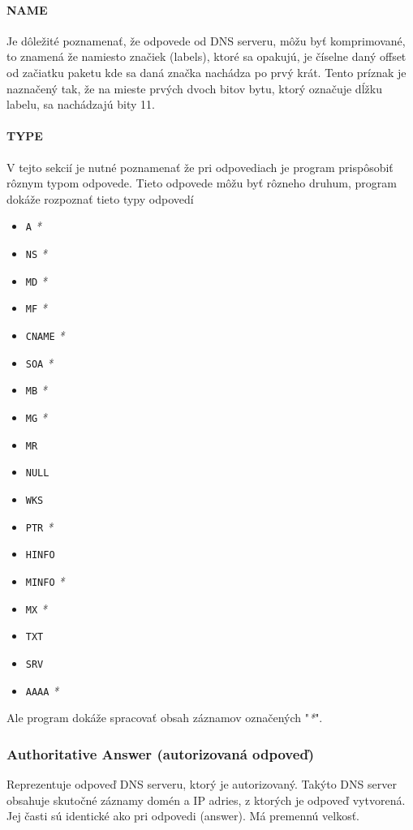 \documentclass[titlepage]{article}
\begin{document}
\paragraph{NAME}
Je dôležité poznamenať, že odpovede od DNS serveru, môžu byť komprimované,
to znamená že namiesto značiek (labels), ktoré sa opakujú, je číselne daný offset
od začiatku paketu kde sa daná značka nachádza po prvý krát. Tento príznak je naznačený tak,
že na mieste prvých dvoch bitov bytu, ktorý označuje dĺžku labelu, sa nachádzajú bity 11.

\paragraph{TYPE}
V tejto sekcií je nutné poznamenať že pri odpovediach je program prispôsobiť rôznym typom odpovede. Tieto
odpovede môžu byť rôzneho druhum, program dokáže rozpoznať tieto typy odpovedí
\begin{itemize}
    \item \verb|A| \textit{*}
    \item \verb|NS| \textit{*}
    \item \verb|MD| \textit{*}
    \item \verb|MF| \textit{*}
    \item \verb|CNAME| \textit{*} 
    \item \verb|SOA| \textit{*}
    \item \verb|MB| \textit{*}
    \item \verb|MG| \textit{*}
    \item \verb|MR|
    \item \verb|NULL|
    \item \verb|WKS|
    \item \verb|PTR| \textit{*}
    \item \verb|HINFO| 
    \item \verb|MINFO| \textit{*}
    \item \verb|MX| \textit{*}
    \item \verb|TXT|
    \item \verb|SRV|
    \item \verb|AAAA| \textit{*}
\end{itemize}

Ale program dokáže spracovať obsah záznamov označených "\textit{*}".

\subsubsection{Authoritative Answer (autorizovaná odpoveď)}
Reprezentuje odpoveď DNS serveru, ktorý je autorizovaný. Takýto DNS server
obsahuje skutočné záznamy domén a IP adries, z ktorých je odpoveď vytvorená.
Jej časti sú identické ako pri odpovedi (answer). Má premennú velkosť. 
\end{document}
